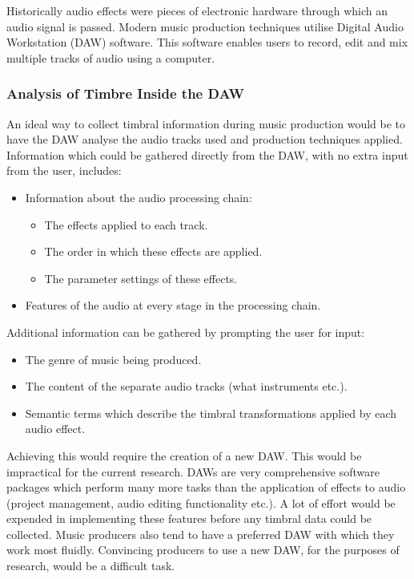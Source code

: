 			Historically audio effects were pieces of electronic hardware through which an audio signal is
			passed. Modern music production techniques utilise Digital Audio Workstation (DAW) software. This
			software enables users to record, edit and mix multiple tracks of audio using a computer. 
			
		\subsubsection{Analysis of Timbre Inside the DAW}
			An ideal way to collect timbral information during music production would be to have the DAW analyse
			the audio tracks used and production techniques applied. Information which could be gathered
			directly from the DAW, with no extra input from the user, includes:

			\begin{itemize}
				\item Information about the audio processing chain:
				\begin{itemize}
					\item The effects applied to each track.
					\item The order in which these effects are applied.
					\item The parameter settings of these effects.
				\end{itemize}

				\item Features of the audio at every stage in the processing chain.
			\end{itemize}

			Additional information can be gathered by prompting the user for input:

			\begin{itemize}
				\item The genre of music being produced.
				\item The content of the separate audio tracks (what instruments etc.).
				\item Semantic terms which describe the timbral transformations applied by each audio
					effect.
			\end{itemize}

			Achieving this would require the creation of a new DAW. This would be impractical for the current
			research. DAWs are very comprehensive software packages which perform many more tasks than the
			application of effects to audio (project management, audio editing functionality etc.). A lot of
			effort would be expended in implementing these features before any timbral data could be collected.
			Music producers also tend to have a preferred DAW with which they work most fluidly. Convincing
			producers to use a new DAW, for the purposes of research, would be a difficult task.


